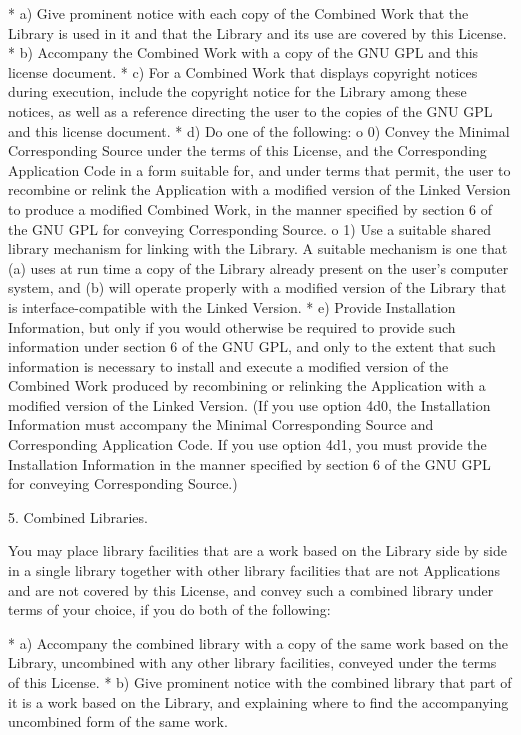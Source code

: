 {\begin{multicols}{4}
    * a) Give prominent notice with each copy of the Combined Work that the Library is used in it and that the Library and its use are covered by this License.
    * b) Accompany the Combined Work with a copy of the GNU GPL and this license document.
    * c) For a Combined Work that displays copyright notices during execution, include the copyright notice for the Library among these notices, as well as a reference directing the user to the copies of the GNU GPL and this license document.
    * d) Do one of the following:
          o 0) Convey the Minimal Corresponding Source under the terms of this License, and the Corresponding Application Code in a form suitable for, and under terms that permit, the user to recombine or relink the Application with a modified version of the Linked Version to produce a modified Combined Work, in the manner specified by section 6 of the GNU GPL for conveying Corresponding Source.
          o 1) Use a suitable shared library mechanism for linking with the Library. A suitable mechanism is one that (a) uses at run time a copy of the Library already present on the user's computer system, and (b) will operate properly with a modified version of the Library that is interface-compatible with the Linked Version.
    * e) Provide Installation Information, but only if you would otherwise be required to provide such information under section 6 of the GNU GPL, and only to the extent that such information is necessary to install and execute a modified version of the Combined Work produced by recombining or relinking the Application with a modified version of the Linked Version. (If you use option 4d0, the Installation Information must accompany the Minimal Corresponding Source and Corresponding Application Code. If you use option 4d1, you must provide the Installation Information in the manner specified by section 6 of the GNU GPL for conveying Corresponding Source.)

5. Combined Libraries.

You may place library facilities that are a work based on the Library side by side in a single library together with other library facilities that are not Applications and are not covered by this License, and convey such a combined library under terms of your choice, if you do both of the following:

    * a) Accompany the combined library with a copy of the same work based on the Library, uncombined with any other library facilities, conveyed under the terms of this License.
    * b) Give prominent notice with the combined library that part of it is a work based on the Library, and explaining where to find the accompanying uncombined form of the same work.


\end{multicols}}

